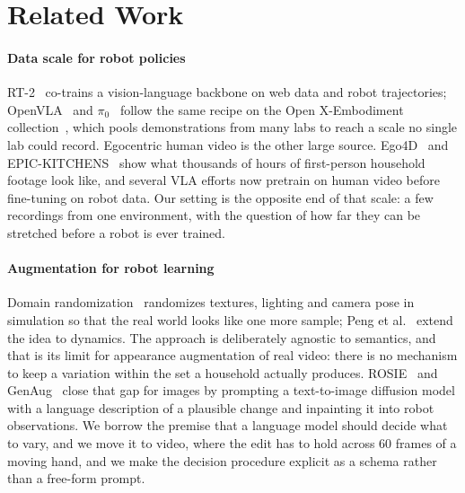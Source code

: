 \section{Related Work}

\paragraph{Data scale for robot policies}
RT-2~\cite{rt2} co-trains a vision-language backbone on web data and robot trajectories; OpenVLA~\cite{openvla} and $\pi_0$~\cite{pi0} follow the same recipe on the Open X-Embodiment collection~\cite{oxe}, which pools demonstrations from many labs to reach a scale no single lab could record. Egocentric human video is the other large source. Ego4D~\cite{ego4d} and EPIC-KITCHENS~\cite{epickitchens100} show what thousands of hours of first-person household footage look like, and several VLA efforts now pretrain on human video before fine-tuning on robot data. Our setting is the opposite end of that scale: a few recordings from one environment, with the question of how far they can be stretched before a robot is ever trained.

\paragraph{Augmentation for robot learning}
Domain randomization~\cite{tobin2017} randomizes textures, lighting and camera pose in simulation so that the real world looks like one more sample; Peng et al.~\cite{peng2018} extend the idea to dynamics. The approach is deliberately agnostic to semantics, and that is its limit for appearance augmentation of real video: there is no mechanism to keep a variation within the set a household actually produces. ROSIE~\cite{rosie} and GenAug~\cite{genaug} close that gap for images by prompting a text-to-image diffusion model with a language description of a plausible change and inpainting it into robot observations. We borrow the premise that a language model should decide what to vary, and we move it to video, where the edit has to hold across 60 frames of a moving hand, and we make the decision procedure explicit as a schema rather than a free-form prompt.

